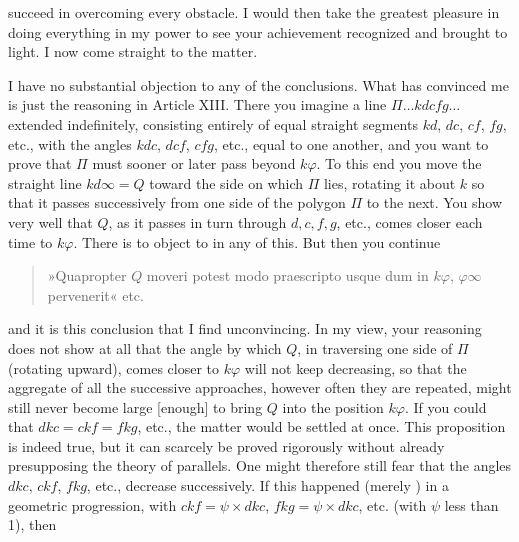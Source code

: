 succeed in overcoming every obstacle. I would then take the
greatest pleasure in doing everything in my power to see your achievement
recognized and brought to light. I now come
straight to the matter.

I have no substantial objection to any of the  conclusions.
What has  
convinced me is just the reasoning in Article XIII. There you imagine
a line $\Pi\dots kdcfg\dots$ extended indefinitely,
consisting entirely of equal straight segments $kd$, $dc$, $cf$,
$fg$, etc., with the angles $kdc$, $dcf$, $cfg$, etc., equal to one another,
and you want to prove that $\Pi$ must sooner or later
pass beyond $k\varphi$. To this end you move the
straight line $kd\infty = Q$ toward the side on which $\Pi$ lies,
rotating it about $k$ so that it passes successively from one side of
the polygon $\Pi$ to the next. You show very well that $Q$,
as it passes in turn through $d, c, f, g$, etc., comes closer each time
to $k\varphi$. There is
to object to in any of this. But then you continue
\begin{center}\end{center}
\begin{quote}
»Quapropter $Q$ moveri potest modo praescripto usque dum in
$k\varphi$, $\varphi\infty$ pervenerit« etc.
\end{quote}
and it is this conclusion that I find unconvincing. In my view,
your reasoning does not show at all that the
angle by which $Q$, in traversing one side of $\Pi$ (rotating
upward), comes closer to $k\varphi$ will not keep decreasing,
so that the aggregate of all the successive approaches, however often
they are repeated, might still never become large [enough]
to bring $Q$ into the position $k\varphi$. If you could 
that $dkc = ckf = fkg$, etc., the matter would be settled at once.
This proposition is indeed true, but it can scarcely be proved rigorously
without already presupposing the theory of parallels. One might
therefore still fear that the angles $dkc$, $ckf$, $fkg$, etc., decrease
successively. If this happened (merely ) in a
geometric progression, with $ckf = \psi \times dkc$,
$fkg = \psi \times dkc$, etc. (with $\psi$ less than 1), then
